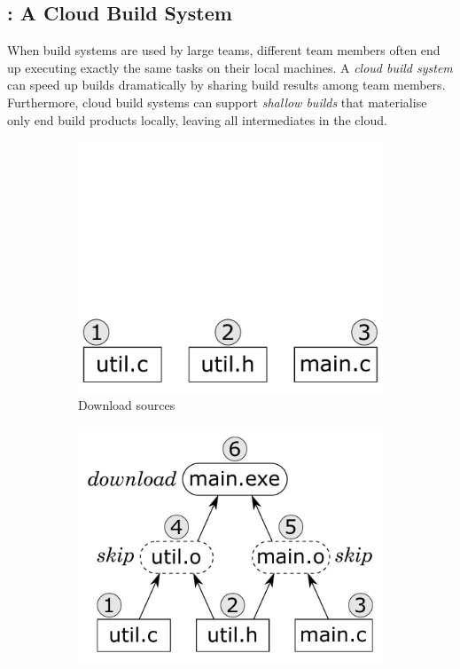 \subsection{\Bazel: A Cloud Build System}\label{sec-background-bazel}

When build systems are used by large teams, different team members often end up
executing exactly the same tasks on their local machines. A \emph{cloud build
system} can speed up builds dramatically by sharing build results
among team members. Furthermore, cloud build systems can support \emph{shallow
builds} that materialise only end build products locally, leaving all
intermediates in the cloud.

\begin{figure}
\begin{subfigure}[b]{0.25\linewidth}
\centerline{\includegraphics[scale=0.28]{fig/bazel-example-checkout.pdf}}
\caption{Download sources}
\end{subfigure}
\begin{subfigure}[b]{0.40\linewidth}
\centerline{\includegraphics[scale=0.28]{fig/bazel-example-build.pdf}}

\end{subfigure}
\end{figure}

